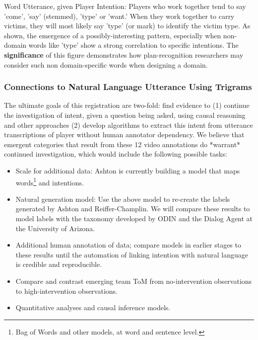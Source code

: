 







Word Utterance, given Player Intention: Players who work together tend to say  'come', 'say' (stemmed), 'type' or 'want.' When they work together to carry victims, they will most likely say 'type' (or mark) to identify the victim type. As shown, the emergence of a possibly-interesting pattern, especially when non-domain words like 'type' show a strong correlation to specific intentions. The \textbf{significance} of this figure demonstrates how plan-recognition researchers may consider such non domain-specific words when designing a domain.



















\newpage

\subsubsection{Connections to Natural Language Utterance Using Trigrams}

The ultimate goals of this registration are two-fold: find evidence to (1)
continue the investigation of intent, given a question being asked, using
causal reasoning and other approaches (2) develop algorithms to extract this
intent from utterance transcriptions of player without human annotator
dependency. We believe that emergent categories that result from these 12 video
annotations do *warrant* continued investigation, which would include the
following possible tasks:

\begin{itemize}
    \item Scale for additional data: Ashton is currently building a model that maps words\footnote{Bag of Words and other models, at word and sentence level.} and intentions.
    \item Natural generation model: Use the above model to re-create the labels
        generated by Ashton and Reiffer-Champlin. We will compare these results
        to model labels with the taxonomy developed by ODIN and the Dialog
        Agent at the University of Arizona.
    \item Additional human annotation of data; compare models in earlier stages to these results until the automation of linking intention with natural language is credible and reproducible.
    \item Compare and contrast emerging team ToM from no-intervention observations to high-intervention observations.
    \item Quantitative analyses and causal inference models.
\end{itemize}

